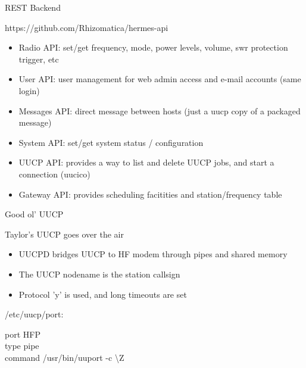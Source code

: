 \documentclass[aspectratio=169,xcolor={x11names,svgnames,dvipsnames}]{beamer}
\begin{document}
\begin{frame}{REST Backend}

\begin{block}{https://github.com/Rhizomatica/hermes-api}
    \begin{itemize}
    \item Radio API: set/get frequency, mode, power levels, volume, swr protection trigger, etc
    \item User API: user management for web admin access and e-mail accounts (same login)
    \item Messages API: direct message between hosts (just a uucp copy of a packaged message)
    \item System API: set/get system status / configuration
    \item UUCP API: provides a way to list and delete UUCP jobs, and start a connection (uucico)
    \item Gateway API: provides scheduling facitities and station/frequency table
    \end{itemize}
  \end{block}

\end{frame}


\begin{frame}{Good ol' UUCP}

\begin{block}{Taylor's UUCP goes over the air}
    \begin{itemize}
    \item UUCPD bridges UUCP to HF modem through pipes and shared memory
    \item The UUCP nodename is the station callsign
    \item Protocol 'y' is used, and long timeouts are set
    \end{itemize}

\vspace{0.5cm}
/etc/uucp/port:
\vspace{0.5cm}

port HFP
\\
type pipe\\
command /usr/bin/uuport -c \textbackslash Z


\end{block}


\end{frame}
\end{document}
